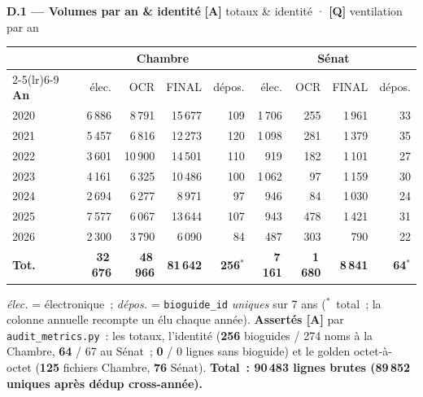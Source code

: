 \documentclass[11pt,a4paper]{article}
\newcommand{\co}[1]{\texttt{\small #1}}
\begin{document}
\textbf{D.1 — Volumes par an \& identité} \hfill {\footnotesize\textbf{[A]} totaux \& identité · \textbf{[Q]} ventilation par an}
\begin{center}\small
\begin{tabular}{l rrrr @{\hspace{1.4em}} rrrr}
\toprule
& \multicolumn{4}{c}{\bfseries\color{houseC}Chambre} & \multicolumn{4}{c}{\bfseries\color{senateC}Sénat}\\
\cmidrule(lr){2-5}\cmidrule(lr){6-9}
\bfseries An & élec. & OCR & FINAL & dépos. & élec. & OCR & FINAL & dépos.\\
\midrule
2020 & 6\,886 & 8\,791 & 15\,677 & 109 & 1\,706 & 255 & 1\,961 & 33 \\
2021 & 5\,457 & 6\,816 & 12\,273 & 120 & 1\,098 & 281 & 1\,379 & 35 \\
2022 & 3\,601 & 10\,900 & 14\,501 & 110 & 919 & 182 & 1\,101 & 27 \\
2023 & 4\,161 & 6\,325 & 10\,486 & 100 & 1\,062 & 97 & 1\,159 & 30 \\
2024 & 2\,694 & 6\,277 & 8\,971 & 97 & 946 & 84 & 1\,030 & 24 \\
2025 & 7\,577 & 6\,067 & 13\,644 & 107 & 943 & 478 & 1\,421 & 31 \\
2026 & 2\,300 & 3\,790 & 6\,090 & 84 & 487 & 303 & 790 & 22 \\
\midrule
\bfseries Tot. & \bfseries 32\,676 & \bfseries 48\,966 & \bfseries 81\,642 & \bfseries 256$^\ast$ & \bfseries 7\,161 & \bfseries 1\,680 & \bfseries 8\,841 & \bfseries 64$^\ast$\\
\bottomrule
\end{tabular}
\end{center}
{\footnotesize \emph{élec.} = électronique~; \emph{dépos.} = \co{bioguide_id} \emph{uniques} sur 7 ans
($^\ast$~total~; la colonne annuelle recompte un élu chaque année). \textbf{Assertés [A]} par
\co{audit_metrics.py}~: les totaux, l'identité (\textbf{256} bioguides / 274 noms à la Chambre, \textbf{64} /
67 au Sénat~; \textbf{0} / 0 lignes sans bioguide) et le golden octet-à-octet (\textbf{125} fichiers Chambre,
\textbf{76} Sénat). \textbf{Total~: 90\,483 lignes brutes (89\,852 uniques après dédup cross-année).}}
\end{document}
